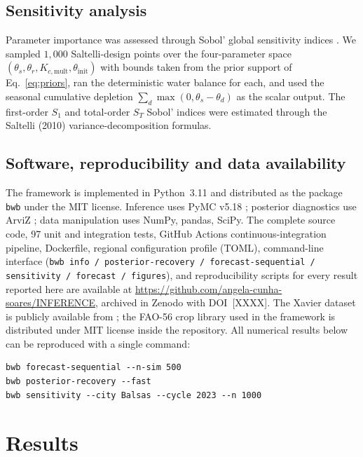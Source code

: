 \documentclass[review,5p,times]{elsarticle}
\begin{document}
\subsection{Sensitivity analysis}\label{sec:methods_sensitivity}

Parameter importance was assessed through Sobol' global sensitivity
indices \cite{Saltelli2010}. We sampled $1{,}000$ Saltelli-design
points over the four-parameter space $(\theta_s, \theta_r,
K_{c,\mathrm{mult}}, \theta_{\mathrm{init}})$ with bounds taken from
the prior support of Eq.~\ref{eq:priors}, ran the deterministic
water balance for each, and used the seasonal cumulative depletion
$\sum_d \max(0, \theta_s - \theta_d)$ as the scalar output. The
first-order $S_1$ and total-order $S_T$ Sobol' indices were estimated
through the Saltelli (2010) variance-decomposition formulas.

\subsection{Software, reproducibility and data availability}
\label{sec:methods_software}

The framework is implemented in Python~3.11 and distributed as the
package \texttt{bwb} under the MIT license. Inference uses PyMC v5.18
\cite{AbrilPla2023}; posterior diagnostics use ArviZ \cite{Kumar2019};
data manipulation uses NumPy, pandas, SciPy. The complete source code,
97 unit and integration tests, GitHub Actions continuous-integration
pipeline, Dockerfile, regional configuration profile (TOML), command-line
interface (\texttt{bwb info / posterior-recovery / forecast-sequential
/ sensitivity / forecast / figures}), and reproducibility scripts for
every result reported here are available at
\url{https://github.com/angela-cunha-soares/INFERENCE}, archived in Zenodo with
DOI~[XXXX]. The Xavier dataset is publicly available from
\cite{Xavier2022}; the FAO-56 crop library used in the framework is
distributed under MIT license inside the repository. All numerical
results below can be reproduced with a single command:
%
\begin{verbatim}
bwb forecast-sequential --n-sim 500
bwb posterior-recovery --fast
bwb sensitivity --city Balsas --cycle 2023 --n 1000
\end{verbatim}

\section{Results}\label{sec:results}
\end{document}

